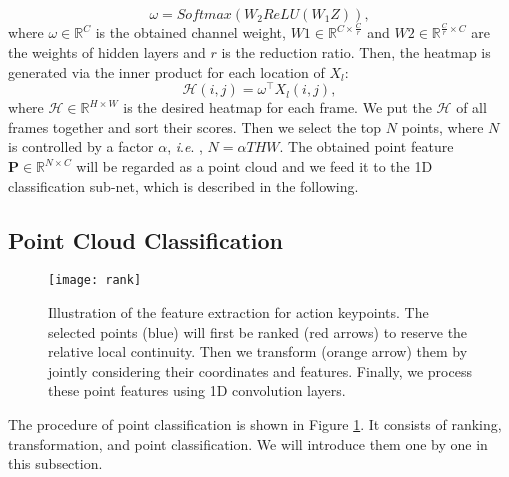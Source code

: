 \documentclass[journal]{IEEEtran}
\newcommand{\ie}{\textit{i}.\textit{e}. }
\begin{document}
\begin{equation}
	\omega = Softmax(W_2 ReLU(W_1Z)),
\end{equation}
where $\omega\in \mathbb{R}^{C}$ is the obtained channel weight, $W1\in \mathbb{R}^{C\times\frac{C}{r}}$ and $W2\in \mathbb{R}^{\frac{C}{r}\times C}$ are the weights of hidden layers and $r$ is the reduction ratio.
Then, the heatmap is generated via the inner product for each location of $X_l$:
\begin{equation}
	\mathcal{H}(i,j) = \omega^\top X_l(i,j),
\end{equation}
where $\mathcal{H}\in \mathbb{R}^{H\times W}$ is the desired heatmap for each frame.
We put the $\mathcal{H}$ of all frames together and sort their scores.
Then we select the top $N$ points, where $N$ is controlled by a factor $\alpha$, \ie, $N=\alpha THW$.
The obtained point feature $\mathbf{P}\in\mathbb{R}^{N\times C}$ will be regarded as a point cloud and we feed it to the 1D classification sub-net, which is described in the following.

\subsection{Point Cloud Classification}

\begin{figure}[ht]
	\centering
	\texttt{[image: rank]}
	\caption{Illustration of the feature extraction for action keypoints.
	The selected points (blue) will first be ranked (red arrows) to reserve the relative local continuity.
	Then we transform (orange arrow) them by jointly considering their coordinates and features.
	Finally, we process these point features using 1D convolution layers.
	}
	\label{fig:rank}
\end{figure}

The procedure of point classification is shown in Figure \ref{fig:rank}.
It consists of ranking, transformation, and point classification.
We will introduce them one by one in this subsection.
\end{document}
